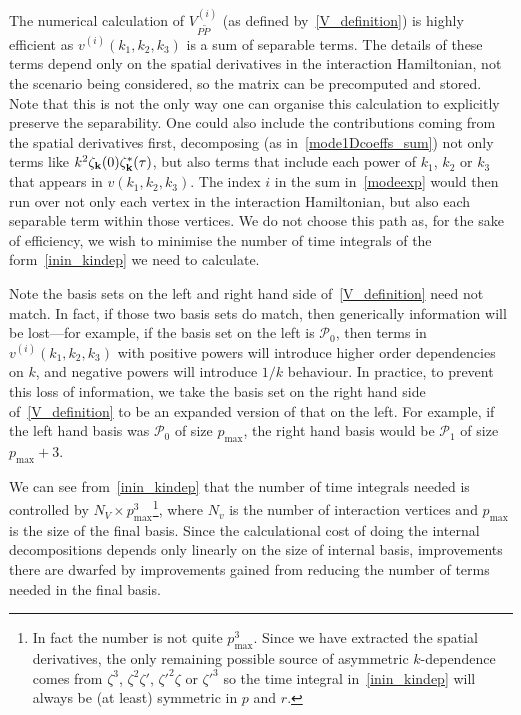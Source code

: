 \documentclass[a4paper,12pt]{extarticle}
\newcommand{\Pmax}{p_\text{max}}
\newcommand{\Lbasic}{\mathcal{P}_0}
\newcommand{\Linvk}{\mathcal{P}_1}
\begin{document}
The numerical calculation of $V^{(i)}_{P\tilde{P}}$ (as defined by~\eqref{V_definition}) is highly efficient as $v^{(i)}(k_1, k_2,k_3)$
is a sum of separable terms. The details of these terms
depend only on the spatial derivatives in the interaction Hamiltonian, not the scenario being
considered, so the matrix can be precomputed and stored.
Note that this is not the only way one can organise this calculation to
explicitly preserve the separability. One could also include the contributions
coming from the spatial derivatives first, decomposing (as in~\eqref{mode1Dcoeffs_sum}) not only terms
like $k^{2} \zeta_{\bf k}(0)\zeta_{\bf k}^*(\tau)$, but also terms that include
each power of $k_1$, $k_2$ or $k_3$ that appears in $v(k_1,k_2,k_3)$. The index $i$
in the sum in~\eqref{modeexp} would then run over not only each vertex in the interaction
Hamiltonian, but also each separable term within those vertices.
We do not choose this path as, for the sake of efficiency, we wish to minimise the
number of time integrals of the form~\eqref{inin_kindep} we need to calculate.


Note the basis sets on the left and right hand side of~\eqref{V_definition}
need not match. In fact, if those two basis sets do match, then generically information
will be lost---for example, if the basis set on the left is $\Lbasic$, then terms
in $v^{(i)}(k_1,k_2,k_3)$ with positive powers will introduce higher order
dependencies on $k$, and negative powers will introduce $1/k$ behaviour. In
practice, to prevent this loss of information, we take the basis set on the right hand
side of~\eqref{V_definition} to be an expanded version of that on the left. For
example, if the left hand basis was $\Lbasic$ of size $\Pmax$, the right hand basis would
be $\Linvk$ of size $\Pmax+3$.


We can see from~\eqref{inin_kindep} that the number of time integrals needed is controlled by
$N_V\times\Pmax^3$\footnote{In fact the number is not quite $\Pmax^3$.
Since we have extracted the spatial derivatives, the only remaining
possible source of asymmetric $k$-dependence
comes from $\zeta^3$, $\zeta^2\zeta'$, $\zeta'^2\zeta$ or $\zeta'^3$
so the time integral in~\eqref{inin_kindep} will always be (at least) symmetric in $p$ and $r$. },
where $N_v$ is the number of interaction vertices
and $\Pmax$ is the size of the final basis.
Since the calculational cost of doing the internal decompositions depends only
linearly on the size of internal basis, improvements there are dwarfed by improvements
gained from reducing the number of terms needed in the final basis.
\end{document}
